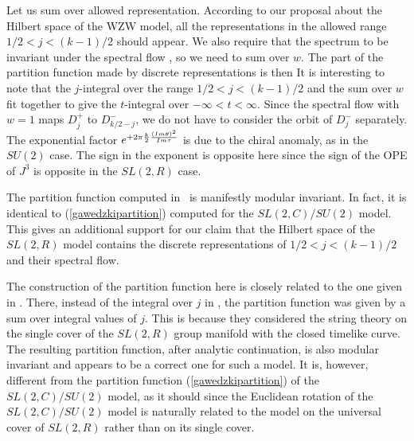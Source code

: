 Let us sum over allowed representation.
According to our proposal about the Hilbert space
of the WZW model, all the representations in the allowed 
range  $1/2 < j < (k-1)/2$ should appear. 
We also require that the spectrum to
be invariant under the spectral flow \spectral , so we need
to sum over $w$. The part of the partition function 
made by discrete representations is then
It is interesting to note that the $j$-integral over the
range $1/2 < j < (k-1)/2$ and the sum over $w$ fit together to
give the $t$-integral over $-\infty < t < \infty$.  
Since the spectral flow with $w=1$ maps $D_j^+$ to $D_{k/2-j}^-$,
we do not have to consider the orbit of $D^-_j$ separately. 
The exponential factor $e^{+ 2\pi {k \over 2} {(Im \theta)^2 \over Im
\tau}}$
is due to the chiral anomaly, as in the $SU(2)$ case. The sign
in the exponent is opposite here since the sign
of the OPE of $J^3$ is opposite in the $SL(2,R)$ case.

The partition function computed in \partition\ is manifestly
modular invariant. In fact, it is identical to (\ref{gawedzkipartition})
computed for the $SL(2,C)/SU(2)$ model. This gives an additional
support for our claim that the Hilbert space of the $SL(2,R)$
model contains the discrete representations of $1/2 < j
< (k-1)/2$ and their spectral flow. 

The construction of the partition function here is
closely related to the one given in \cite{Henningson:1991jc}.
There, instead of the integral over $j$ in \partition ,
the partition function was given by a sum over integral
values of $j$. This is because they considered the string theory
on the single cover of the $SL(2,R)$ group manifold with the closed 
timelike curve. The resulting partition function, after analytic
continuation, is also modular invariant and appears to be a correct
one for such a model. It is, however, different from the partition function
(\ref{gawedzkipartition}) of the $SL(2,C)/SU(2)$ model, as it should  
since the Euclidean rotation of the $SL(2,C)/SU(2)$ model is naturally
related to the model on the universal cover of $SL(2,R)$ rather
than on its single cover. 


